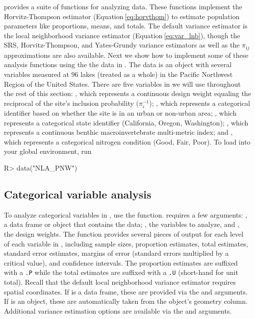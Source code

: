 \documentclass[
  shortnames]{jss}
\begin{document}
 provides a suite of functions for analyzing data. These
functions implement the Horvitz-Thompson estimator
(Equation\(~\)\ref{eq:horvthom}) to estimate population parameters like
proportions, means, and totals. The default variance estimator is the
local neighborhood variance estimator (Equation\(~\)\ref{eq:var_lnb}),
though the SRS, Horvitz-Thompson, and Yates-Grundy variance estimators
as well as the \(\pi_{ij}\) approximations are also available. Next we
show how to implement some of these analysis functions using the the
 data in . The  data is an
 object with several variables measured at 96 lakes (treated as
a whole) in the Pacific Northwest Region of the United States. There are
five variables in  we will use throughout the rest of this
section: , which represents a continuous design weight
equaling the reciprocal of the site's inclusion probability
(\(\pi_i^{-1}\)); , which represents a categorical
identifier based on whether the site is in an urban or non-urban area;
, which represents a categorical state identifier
(California, Oregon, Washington); , which represents a
continuous benthic macroinvertebrate multi-metric index; and
, which represents a categorical nitrogen condition
(Good, Fair, Poor). To load  into your global environment,
run

\begin{CodeChunk}
\begin{CodeInput}
R> data("NLA_PNW")
\end{CodeInput}
\end{CodeChunk}

\hypertarget{subsec:catt_analysis}{%
\subsection{Categorical variable analysis}\label{subsec:catt_analysis}}

To analyze categorical variables in , use the
 function.  requires a few
arguments: , a data frame or  object that contains
the data; , the variables to analyze, and , the
design weights. The  function provides several pieces
of output for each level of each variable in , including
sample sizes, proportion estimates, total estimates, standard error
estimates, margins of error (standard errors multiplied by a critical
value), and confidence intervals. The proportion estimates are suffixed
with a \texttt{.P} while the total estimates are suffixed with a
\texttt{.U} (short-hand for unit total). Recall that the default local
neighborhood variance estimator requires spatial coordinates. If
 is a data frame, these are provided via the 
and  arguments. If  is an  object,
these are automatically taken from the  object's geometry
column. Additional variance estimation options are available via the
 and  arguments.
\end{document}
